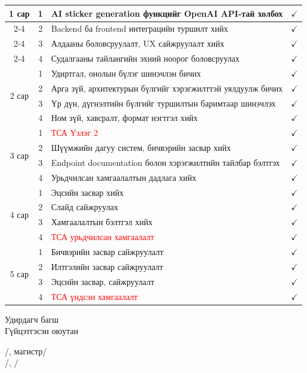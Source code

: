 \begin{table}[H]
\begin{tabular}{|c|c|p{8.4cm}|c|}
\multirow{4}{*}{1 сар}
& 1 & AI sticker generation функцийг OpenAI API-тай холбох & $\checkmark$ \\
\cline{2-4}
& 2 & Backend ба frontend интеграцийн туршилт хийх & $\checkmark$ \\
\cline{2-4}
& 3 & Алдааны боловсруулалт, UX сайжруулалт хийх & $\checkmark$ \\
\cline{2-4}
& 4 & Судалгааны тайлангийн эхний ноорог боловсруулах & $\checkmark$ \\
\hline

\multirow{4}{*}{2 сар}
& 1 & Удиртгал, онолын бүлэг шинэчлэн бичих & $\checkmark$ \\
\cline{2-4}
& 2 & Арга зүй, архитектурын бүлгийг хэрэгжилттэй уялдуулж бичих & $\checkmark$ \\
\cline{2-4}
& 3 & Үр дүн, дүгнэлтийн бүлгийг туршилтын баримтаар шинэчлэх & $\checkmark$ \\
\cline{2-4}
& 4 & Ном зүй, хавсралт, формат нэгтгэл хийх & $\checkmark$ \\
\hline

\multirow{4}{*}{3 сар}
& 1 & \textcolor{red}{ТСА Үзлэг 2} & $\checkmark$ \\
\cline{2-4}
& 2 & Шүүмжийн дагуу систем, бичвэрийн засвар хийх & $\checkmark$ \\
\cline{2-4}
& 3 & Endpoint documentation болон хэрэгжилтийн тайлбар бэлтгэх & $\checkmark$ \\
\cline{2-4}
& 4 & Урьдчилсан хамгаалалтын дадлага хийх & $\checkmark$ \\
\hline

\multirow{4}{*}{4 сар}
& 1 & Эцсийн засвар хийх & $\checkmark$ \\
\cline{2-4}
& 2 & Слайд сайжруулах & $\checkmark$ \\
\cline{2-4}
& 3 & Хамгаалалтын бэлтгэл хийх & $\checkmark$ \\
\cline{2-4}
& 4 & \textcolor{red}{ТСА урьдчилсан хамгаалалт} & $\checkmark$ \\
\hline

\multirow{4}{*}{5 сар}
& 1 & {Бичвэрийн засвар сайжруулалт} & $\checkmark$ \\
\cline{2-4}
& 2 & {Илтгэлийн засвар сайжруулалт} & $\checkmark$ \\
\cline{2-4}
& 3 & Эцсийн засвар, сайжруулалт & $\checkmark$ \\
\cline{2-4}
& 4 & \textcolor{red}{ТСА үндсэн хамгаалалт} & $\checkmark$ \\
\hline

\end{tabular}
\end{table}

\vspace{10mm}

\noindent
\begin{minipage}{0.4\textwidth}
Удирдагч багш\\
Гүйцэтгэсэн оюутан
\end{minipage}
\hfill
\begin{minipage}{0.55\textwidth}
\raggedleft

/\supervisorname, магистр/\\
/\studentID, \authorShort/\\

\end{minipage}
\noindent
